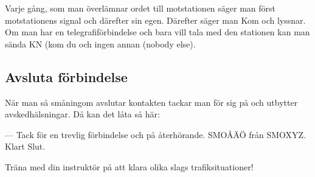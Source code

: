 Varje gång, som man överlämnar ordet till motstationen
säger man först motstationens signal och därefter sin egen. Därefter
säger man Kom och lyssnar. Om man har en telegrafiförbindelse och bara
vill tala med den stationen kan man sända KN (kom du och ingen annan
(nobody else).

\subsection{Avsluta förbindelse}

När man så småningom avslutar kontakten tackar man för sig på och
utbytter avskedhälsningar.  Då kan det låta så här:

--- Tack för en trevlig förbindelse och på återhörande. SMOÅÄÖ från
SMOXYZ. Klart Slut.

Träna med din instruktör på att klara olika slags trafiksituationer!
